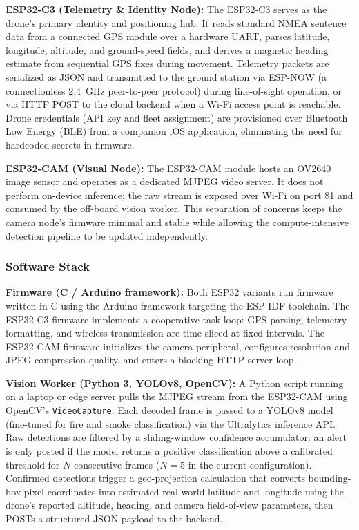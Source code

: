 \documentclass[journal, onecolumn]{IEEEtran}
\begin{document}
\textbf{ESP32-C3 (Telemetry \& Identity Node):}
The ESP32-C3 serves as the drone's primary identity and positioning hub. It reads standard NMEA sentence data from a connected GPS module over a hardware UART, parses latitude, longitude, altitude, and ground-speed fields, and derives a magnetic heading estimate from sequential GPS fixes during movement. Telemetry packets are serialized as JSON and transmitted to the ground station via ESP-NOW (a connectionless 2.4~GHz peer-to-peer protocol) during line-of-sight operation, or via HTTP POST to the cloud backend when a Wi-Fi access point is reachable. Drone credentials (API key and fleet assignment) are provisioned over Bluetooth Low Energy (BLE) from a companion iOS application, eliminating the need for hardcoded secrets in firmware.

\textbf{ESP32-CAM (Visual Node):}
The ESP32-CAM module hosts an OV2640 image sensor and operates as a dedicated MJPEG video server. It does not perform on-device inference; the raw stream is exposed over Wi-Fi on port 81 and consumed by the off-board vision worker. This separation of concerns keeps the camera node's firmware minimal and stable while allowing the compute-intensive detection pipeline to be updated independently.

\subsubsection{Software Stack}

\textbf{Firmware (C / Arduino framework):}
Both ESP32 variants run firmware written in C using the Arduino framework targeting the ESP-IDF toolchain. The ESP32-C3 firmware implements a cooperative task loop: GPS parsing, telemetry formatting, and wireless transmission are time-sliced at fixed intervals. The ESP32-CAM firmware initializes the camera peripheral, configures resolution and JPEG compression quality, and enters a blocking HTTP server loop.

\textbf{Vision Worker (Python 3, YOLOv8, OpenCV):}
A Python script running on a laptop or edge server pulls the MJPEG stream from the ESP32-CAM using OpenCV's \texttt{VideoCapture}. Each decoded frame is passed to a YOLOv8 model (fine-tuned for fire and smoke classification) via the Ultralytics inference API. Raw detections are filtered by a sliding-window confidence accumulator: an alert is only posted if the model returns a positive classification above a calibrated threshold for $N$ consecutive frames ($N = 5$ in the current configuration). Confirmed detections trigger a geo-projection calculation that converts bounding-box pixel coordinates into estimated real-world latitude and longitude using the drone's reported altitude, heading, and camera field-of-view parameters, then POSTs a structured JSON payload to the backend.
\end{document}

